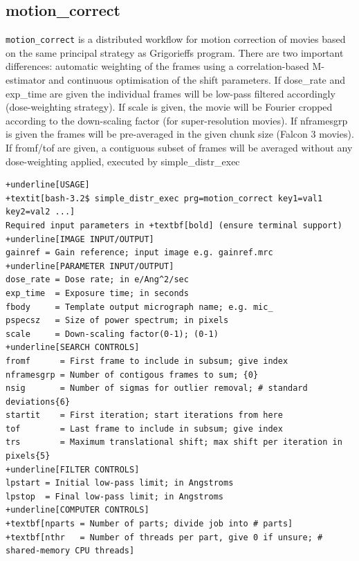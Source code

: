\documentclass[a4paper,11pt]{article}
\newcommand{\prgname}[1]{\textcolor{NavyBlue}{\texttt{#1}}}
\begin{document}
\subsection{motion\_correct}
\label{motion_correct}
\prgname{motion\_correct} is a distributed workflow for motion correction of movies based on the same principal strategy as Grigorieffs program. There are two important differences: automatic weighting of the frames using a correlation-based M-estimator and continuous optimisation of the shift parameters. If dose\_rate and exp\_time are given the individual frames will be low-pass filtered accordingly (dose-weighting strategy). If scale is given, the movie will be Fourier cropped according to the down-scaling factor (for super-resolution movies). If nframesgrp is given the frames will be pre-averaged in the given chunk size (Falcon 3 movies). If fromf/tof are given, a contiguous subset of frames will be averaged without any dose-weighting applied, executed by simple\_distr\_exec
\begin{Verbatim}[commandchars=+\[\],fontsize=\small,breaklines=true]
+underline[USAGE]
+textit[bash-3.2$ simple_distr_exec prg=motion_correct key1=val1 key2=val2 ...]
Required input parameters in +textbf[bold] (ensure terminal support)
+underline[IMAGE INPUT/OUTPUT]
gainref = Gain reference; input image e.g. gainref.mrc
+underline[PARAMETER INPUT/OUTPUT]
dose_rate = Dose rate; in e/Ang^2/sec
exp_time  = Exposure time; in seconds
fbody     = Template output micrograph name; e.g. mic_
pspecsz   = Size of power spectrum; in pixels
scale     = Down-scaling factor(0-1); (0-1)
+underline[SEARCH CONTROLS]
fromf      = First frame to include in subsum; give index
nframesgrp = Number of contigous frames to sum; {0}
nsig       = Number of sigmas for outlier removal; # standard deviations{6}
startit    = First iteration; start iterations from here
tof        = Last frame to include in subsum; give index
trs        = Maximum translational shift; max shift per iteration in pixels{5}
+underline[FILTER CONTROLS]
lpstart = Initial low-pass limit; in Angstroms
lpstop  = Final low-pass limit; in Angstroms
+underline[COMPUTER CONTROLS]
+textbf[nparts = Number of parts; divide job into # parts]
+textbf[nthr   = Number of threads per part, give 0 if unsure; # shared-memory CPU threads]
\end{Verbatim}
\end{document}
